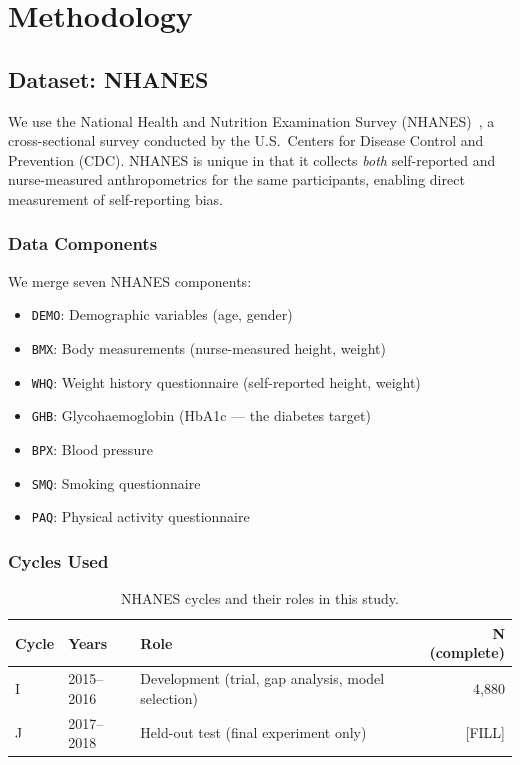 \documentclass[12pt, a4paper, oneside]{report}
\theoremstyle{definition}
\begin{document}
\chapter{Methodology}
\label{chap:methodology}


\section{Dataset: NHANES}

We use the National Health and Nutrition Examination Survey
(NHANES)~\citep{johnson2014national}, a cross-sectional survey conducted
by the U.S.\ Centers for Disease Control and Prevention (CDC).
NHANES is unique in that it collects \textit{both} self-reported and
nurse-measured anthropometrics for the same participants, enabling direct
measurement of self-reporting bias.

\subsection{Data Components}

We merge seven NHANES components:
\begin{itemize}
  \item \texttt{DEMO}: Demographic variables (age, gender)
  \item \texttt{BMX}: Body measurements (nurse-measured height, weight)
  \item \texttt{WHQ}: Weight history questionnaire (self-reported height, weight)
  \item \texttt{GHB}: Glycohaemoglobin (HbA1c --- the diabetes target)
  \item \texttt{BPX}: Blood pressure
  \item \texttt{SMQ}: Smoking questionnaire
  \item \texttt{PAQ}: Physical activity questionnaire
\end{itemize}

\subsection{Cycles Used}

\begin{table}[htbp]
  \centering
  \caption{NHANES cycles and their roles in this study.}
  \label{tab:cycles}
  \begin{tabular}{lllr}
    \toprule
    Cycle & Years & Role & N (complete) \\
    \midrule
    I  & 2015--2016 & Development (trial, gap analysis, model selection) & 4,880 \\
    J  & 2017--2018 & Held-out test (final experiment only) & [FILL] \\
    \bottomrule
  \end{tabular}
\end{table}
\end{document}
